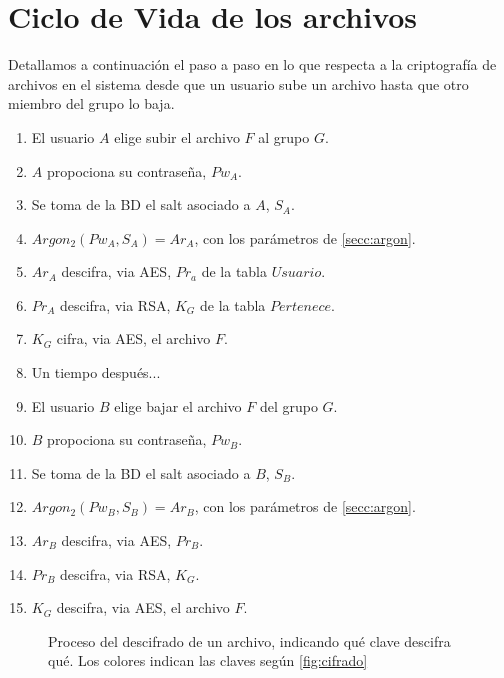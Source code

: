 \section{Ciclo de Vida de los archivos}

Detallamos a continuación el paso a paso en lo que respecta a la criptografía 
de archivos en el sistema desde que un usuario sube un archivo hasta que otro
miembro del grupo lo baja.

\begin{enumerate}
	\item El usuario \(A\) elige subir el archivo \(F\) al grupo \(G\).
	\item \(A\) propociona su contraseña, \(Pw_A\).
	\item Se toma de la BD el salt asociado a \(A\), \(S_A\).
	\item \(Argon_2(Pw_A, S_A) = Ar_A\), con los parámetros de \autoref{secc:argon}.
	\item \(Ar_A\) descifra, via AES,  \(Pr_a\) de la tabla \(Usuario\).
	\item \(Pr_A\) descifra, via RSA,  \(K_G\) de la tabla \(Pertenece\).
	\item \(K_G\) cifra, via AES, el archivo \(F\).

	\item[] Un tiempo después...
	
	\item El usuario \(B\) elige bajar el archivo \(F\) del grupo \(G\).
	\item \(B\) propociona su contraseña, \(Pw_B\).
	\item Se toma de la BD el salt asociado a \(B\), \(S_B\).
	\item \(Argon_2(Pw_B, S_B) = Ar_B\), con los parámetros de \autoref{secc:argon}.
	\item \(Ar_B\) descifra, via AES,  \(Pr_B\).
	\item \(Pr_B\) descifra, via RSA,  \(K_G\).
	\item \(K_G\) descifra, via AES, el archivo \(F\).
\end{enumerate}

\begin{figure}[H]
    \centering
    \caption{Proceso del descifrado de un archivo, indicando qué clave descifra qué.
             Los colores indican las claves según \autoref{fig:cifrado}}\label{fig:proceso}
\end{figure}
